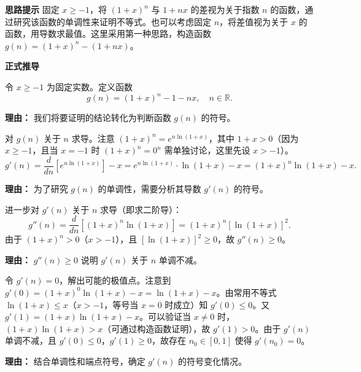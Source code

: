 \begin{proofbox}
\textbf{\textcolor{CProof}{思路提示}}
固定 $x \geq -1$，将 $(1+x)^n$ 与 $1+nx$ 的差视为关于指数 $n$ 的函数，通过研究该函数的单调性来证明不等式。也可以考虑固定 $n$，将差值视为关于 $x$ 的函数，用导数求最值。这里采用第一种思路，构造函数 $g(n) = (1+x)^n - (1+nx)$。

\medskip
\textbf{\textcolor{CProof}{正式推导}}
\begin{description}[style=nextline, leftmargin=2.8em, labelsep=0.5em, itemsep=0.55em]
    \item[\textbf{步骤一（构造函数）：}] 令 $x \geq -1$ 为固定实数。定义函数
    \[
    g(n) = (1+x)^n - 1 - nx, \quad n \in \mathbb{R}.
    \]
    \par\textbf{理由：} 我们将要证明的结论转化为判断函数 $g(n)$ 的符号。

    \item[\textbf{步骤二（求导判单调）：}] 对 $g(n)$ 关于 $n$ 求导。注意 $(1+x)^n = e^{n \ln(1+x)}$，其中 $1+x > 0$（因为 $x \geq -1$，且当 $x=-1$ 时 $(1+x)^n=0^n$ 需单独讨论，这里先设 $x>-1$）。
    \[
    g'(n) = \frac{d}{dn} \left[ e^{n \ln(1+x)} \right] - x = e^{n \ln(1+x)} \cdot \ln(1+x) - x = (1+x)^n \ln(1+x) - x.
    \]
    \par\textbf{理由：} 为了研究 $g(n)$ 的单调性，需要分析其导数 $g'(n)$ 的符号。

    \item[\textbf{步骤三（分析导函数）：}] 进一步对 $g'(n)$ 关于 $n$ 求导（即求二阶导）：
    \[
    g''(n) = \frac{d}{dn} \left[ (1+x)^n \ln(1+x) \right] = (1+x)^n \left[ \ln(1+x) \right]^2.
    \]
    由于 $(1+x)^n > 0$（$x>-1$），且 $\left[ \ln(1+x) \right]^2 \geq 0$，故 $g''(n) \geq 0$。
    \par\textbf{理由：} $g''(n) \geq 0$ 说明 $g'(n)$ 关于 $n$ 单调不减。

    \item[\textbf{步骤四（寻找临界点）：}] 令 $g'(n)=0$，解出可能的极值点。注意到 $g'(0) = (1+x)^0 \ln(1+x) - x = \ln(1+x) - x$。由常用不等式 $\ln(1+x) \leq x$（$x>-1$，等号当 $x=0$ 时成立）知 $g'(0) \leq 0$。又 $g'(1) = (1+x) \ln(1+x) - x$。可以验证当 $x \neq 0$ 时，$(1+x) \ln(1+x) > x$（可通过构造函数证明），故 $g'(1) > 0$。由于 $g'(n)$ 单调不减，且 $g'(0) \leq 0$，$g'(1) \geq 0$，故存在 $n_0 \in [0,1]$ 使得 $g'(n_0)=0$。
    \par\textbf{理由：} 结合单调性和端点符号，确定 $g'(n)$ 的符号变化情况。


\end{description}
\end{proofbox}
